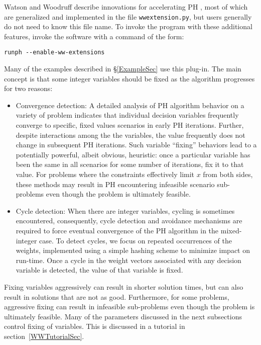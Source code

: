 Watson and Woodruff describe innovations for accelerating PH \cite{phinnovate}, most of which are generalized and
implemented in the 
file \verb|wwextension.py|, but users generally do not need to know this file name. To invoke the program 
with these additional features, invoke the software with a command of the form:
\begin{verbatim}
runph --enable-ww-extensions
\end{verbatim}
Many of the examples described in \S\ref{ExampleSec} use this plug-in. The main concept
is that some integer variables should be fixed as the algorithm progresses for two reasons:

\begin{itemize}
\item Convergence detection: 
A detailed analysis of PH algorithm behavior on a variety of problem indicates that individual decision variables 
frequently converge to specific, 
fixed values scenarios in early PH iterations. Further, despite interactions among the 
the variables, the value frequently does not change in subsequent PH 
iterations. Such variable ``fixing'' behaviors lead to a potentially powerful, albeit obvious, heuristic: once 
a particular variable has been the same in all scenarios for some number of iterations, fix it to that value.
For problems where the constraints effectively limit $x$ 
from both sides, these methods may result in PH encountering infeasible scenario sub-problems even though the 
problem is ultimately feasible.
\item Cycle detection: When there are integer variables, cycling is sometimes
encountered, consequently, cycle detection and avoidance mechanisms are required to force 
eventual convergence of the PH algorithm in the mixed-integer case. To detect cycles, we focus on 
repeated occurrences of the weights, implemented using a simple hashing scheme \cite{tabuhash} to 
minimize impact on run-time. Once a cycle in the weight vectors associated with any decision variable is detected,
the value of that variable is fixed. 
\end{itemize}

Fixing variables aggressively can result in shorter solution times, but can also result in solutions that are not as good. Furthermore, for some problems, aggressive fixing can result in infeasible sub-problems even though the problem is
ultimately feasible. Many of the parameters discussed in the next subsections control fixing of variables. This is
discussed in a tutorial in section~\ref{WWTutorialSec}.

